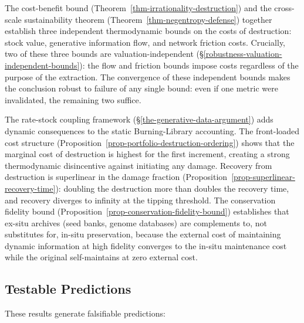\documentclass[11pt]{article}
\theoremstyle{plain}
\theoremstyle{definition}
\theoremstyle{remark}
\let\origsubsection\subsection
\renewcommand{\subsection}{\needspace{7\baselineskip}\origsubsection}
\begin{document}
The cost-benefit bound (Theorem~\ref{thm-irrationality-destruction}) and
the cross-scale sustainability theorem
(Theorem~\ref{thm-negentropy-defense}) together establish three
independent thermodynamic bounds on the costs of destruction: stock
value, generative information flow, and network friction costs.
Crucially, two of these three bounds are valuation-independent
(§\ref{robustness-valuation-independent-bounds}): the flow and friction
bounds impose costs regardless of the purpose of the extraction. The
convergence of these independent bounds makes the conclusion robust to
failure of any single bound: even if one metric were invalidated, the
remaining two suffice.

The rate-stock coupling framework (§\ref{the-generative-data-argument})
adds dynamic consequences to the static Burning-Library accounting. The
front-loaded cost structure
(Proposition~\ref{prop-portfolio-destruction-ordering}) shows that the
marginal cost of destruction is highest for the first increment,
creating a strong thermodynamic disincentive against initiating any
damage. Recovery from destruction is superlinear in the damage fraction
(Proposition~\ref{prop-superlinear-recovery-time}): doubling the
destruction more than doubles the recovery time, and recovery diverges
to infinity at the tipping threshold. The conservation fidelity bound
(Proposition~\ref{prop-conservation-fidelity-bound}) establishes that
ex-situ archives (seed banks, genome databases) are complements to, not
substitutes for, in-situ preservation, because the external cost of
maintaining dynamic information at high fidelity converges to the
in-situ maintenance cost while the original self-maintains at zero
external cost.

\subsection{Testable Predictions}\label{testable-predictions}

These results generate falsifiable predictions:
\end{document}
